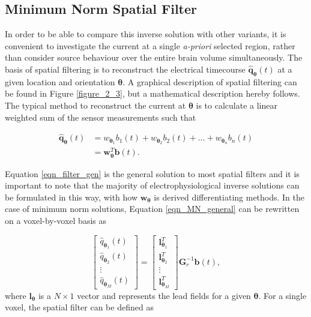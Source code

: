 \subsection{Minimum Norm Spatial Filter}
In order to be able to compare this inverse solution with other variants, it is convenient to investigate the current at a single \textit{a-priori} selected region, rather than consider source behaviour over the entire brain volume simultaneously. The basis of spatial filtering is to reconstruct the electrical timecourse $\hat{\mathbf{q}}_\mathbf{\theta}(t)$ at a given location and orientation $\mathbf{\theta}$. A graphical description of spatial filtering can be found in Figure \ref{figure_2_3}, but a mathematical description hereby follows. The typical method to reconstruct the current at $\mathbf{\theta}$ is to calculate a linear weighted sum of the sensor measurements such that

\begin{equation}\label{eqn_filter_gen}
	\begin{aligned}
		\hat{\mathbf{q}}_\mathbf{\theta}(t) &= w_{\mathbf{\theta}_1}b_1(t) + w_{\mathbf{\theta}_2}b_2(t) + \ldots + w_{\mathbf{\theta}_n}b_n(t) \\
		&= \mathbf{w}^T_\mathbf{\theta}\mathbf{b}(t).
	\end{aligned}
\end{equation}

Equation \ref{eqn_filter_gen} is the general solution to most spatial filters and it is important to note that the majority of electrophysiological inverse solutions can be formulated in this way, with how $ \mathbf{w}_\mathbf{\theta}$ is derived differentiating methods. In the case of minimum norm solutions, Equation \ref{eqn_MN_general} can be rewritten on a voxel-by-voxel basis as

\begin{equation}
		\begin{bmatrix} 
		\hat{q}_{\mathbf{\theta}_1}(t) \\ \hat{q}_{\mathbf{\theta}_2}(t) \\ \vdots \\ \hat{q}_{\mathbf{\theta}_M}(t)
		\end{bmatrix} = 
		\begin{bmatrix} 
		\mathbf{l}^T_{\mathbf{\theta}_1} \\ \mathbf{l}^T_{\mathbf{\theta}_2} \\ \vdots \\ \mathbf{l}^T_{\mathbf{\theta}_M}
		\end{bmatrix}\mathbf{G}^{-1}_r\mathbf{b}(t),
\end{equation} where $\mathbf{l}_{\mathbf{\theta}}$ is a $N \times 1$ vector and represents the lead fields for a given $\mathbf{\theta}$. For a single voxel, the spatial filter can be defined as

